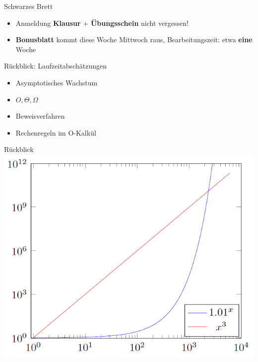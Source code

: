 



\graphicspath{{../figures/}}

\morescalingdelimiters



\begin{frame}{Schwarzes Brett}
	\begin{itemize}
		\item Anmeldung \textbf{Klausur} $+$ \textbf{Übungsschein} nicht vergessen!
		\item \textbf{Bonusblatt} kommt diese Woche Mittwoch raus, Bearbeitungszeit: etwa \textbf{eine} Woche
	\end{itemize}
\end{frame}

\framePrevEpisode

\begin{frame}{Rückblick: Laufzeitabschätzungen}
	\begin{itemize}[<+->]
		\item Asymptotisches Wachstum
		\item $O, \Theta, \Omega$
		\item Beweisverfahren
		\item Rechenregeln im O-Kalkül
	\end{itemize}
\end{frame}

\begin{frame}{Rückblick}
	\centering
	\includegraphics[scale=0.5]{laufzeit/polyVsExp}
\end{frame}

